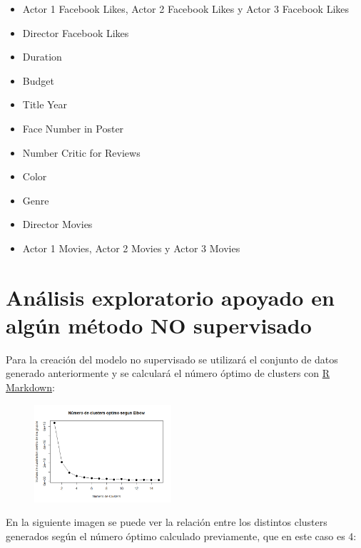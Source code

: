 \documentclass{article}
\begin{document}
\begin{itemize}
  \item Actor 1 Facebook Likes, Actor 2 Facebook Likes y Actor 3 Facebook Likes
  \item Director Facebook Likes
  \item Duration
  \item Budget
  \item Title Year
  \item Face Number in Poster
  \item Number Critic for Reviews
  \item Color
  \item Genre
  \item Director Movies
  \item Actor 1 Movies, Actor 2 Movies y Actor 3 Movies
\end{itemize}

\clearpage

\section{Análisis exploratorio apoyado en algún método NO supervisado}

Para la creación del modelo no supervisado se utilizará el conjunto de datos generado anteriormente y se calculará el número óptimo de clusters con \href{https://github.com/pozueco/proyecto_fin_de_master/blob/master/model_no_supervised.md}{R Markdown}:

\begin{figure}[h]
\centering
\includegraphics[width=2in,clip,keepaspectratio]{./model_no_supervised_files/figure-markdown_github/unnamed-chunk-2-1}
\end{figure}

En la siguiente imagen se puede ver la relación entre los distintos clusters generados según el número óptimo calculado previamente, que en este caso es 4:
\end{document}
